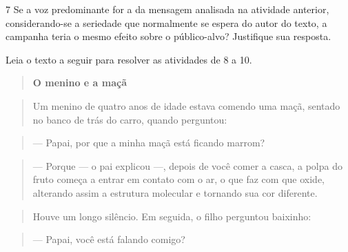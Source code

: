 
\num{7} Se a voz predominante for a da mensagem analisada na atividade
anterior, considerando-se a seriedade que normalmente se espera do autor
do texto, a campanha teria o mesmo efeito sobre o público-alvo?
Justifique sua resposta.


Leia o texto a seguir para resolver as atividades de 8 a 10.

\begin{quote}
\textbf{O menino e a maçã}
\end{quote}

\begin{quote}
Um menino de quatro anos de idade estava comendo uma maçã, sentado no
banco de trás do carro, quando perguntou:
\end{quote}

\begin{quote}
--- Papai, por que a minha maçã está ficando marrom?
\end{quote}

\begin{quote}
--- Porque --- o pai explicou ---, depois de você comer a casca, a polpa
do fruto começa a entrar em contato com o ar, o que faz com que oxide,
alterando assim a estrutura molecular e tornando sua cor diferente.
\end{quote}

\begin{quote}
Houve um longo silêncio. Em seguida, o filho perguntou baixinho:
\end{quote}

\begin{quote}
--- Papai, você está falando comigo?
\end{quote}



